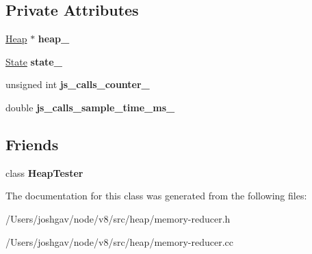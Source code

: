 \subsection*{Private Attributes}
\begin{DoxyCompactItemize}
\item 
\hyperlink{classv8_1_1internal_1_1_heap}{Heap} $\ast$ {\bfseries heap\+\_\+}\hypertarget{classv8_1_1internal_1_1_memory_reducer_ac1f4f4b3845a868e173be5d35e7eb5ea}{}\label{classv8_1_1internal_1_1_memory_reducer_ac1f4f4b3845a868e173be5d35e7eb5ea}

\item 
\hyperlink{structv8_1_1internal_1_1_memory_reducer_1_1_state}{State} {\bfseries state\+\_\+}\hypertarget{classv8_1_1internal_1_1_memory_reducer_a12bcf7083c7d03b7d1384e8d3b222643}{}\label{classv8_1_1internal_1_1_memory_reducer_a12bcf7083c7d03b7d1384e8d3b222643}

\item 
unsigned int {\bfseries js\+\_\+calls\+\_\+counter\+\_\+}\hypertarget{classv8_1_1internal_1_1_memory_reducer_aec8d9a808b4582f1938442ae7bcf0376}{}\label{classv8_1_1internal_1_1_memory_reducer_aec8d9a808b4582f1938442ae7bcf0376}

\item 
double {\bfseries js\+\_\+calls\+\_\+sample\+\_\+time\+\_\+ms\+\_\+}\hypertarget{classv8_1_1internal_1_1_memory_reducer_a885842874f44e3b0d8310270bd2097ae}{}\label{classv8_1_1internal_1_1_memory_reducer_a885842874f44e3b0d8310270bd2097ae}

\end{DoxyCompactItemize}
\subsection*{Friends}
\begin{DoxyCompactItemize}
\item 
class {\bfseries Heap\+Tester}\hypertarget{classv8_1_1internal_1_1_memory_reducer_aee0aab59f992bea8603b7be9e9b2f30d}{}\label{classv8_1_1internal_1_1_memory_reducer_aee0aab59f992bea8603b7be9e9b2f30d}

\end{DoxyCompactItemize}


The documentation for this class was generated from the following files\+:\begin{DoxyCompactItemize}
\item 
/\+Users/joshgav/node/v8/src/heap/memory-\/reducer.\+h\item 
/\+Users/joshgav/node/v8/src/heap/memory-\/reducer.\+cc\end{DoxyCompactItemize}
